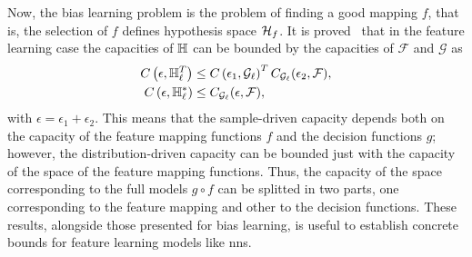 Now, the bias learning problem is the problem of finding a good mapping $f$, that is, the selection of $f$ defines hypothesis space $\mathcal{H}_f$.
It is proved~\cite[Theorem~6]{baxter2000model} that in the feature learning case the capacities of $\mathbb{H}$ can be bounded by the capacities of $\mathcal{F}$ and $\mathcal{G}$ as
\begin{align*}
    C\left(\epsilon, \mathbb{H}^{T}_\ell\right) &\leq C\left(\epsilon_1, \mathcal{G}_\ell\right)^T C_{\mathcal{G}_\ell}(\epsilon_2, \mathcal{F}) , \\
    C\left(\epsilon, \mathbb{H}^{*}_\ell\right) &\leq C_{\mathcal{G}_\ell}(\epsilon, \mathcal{F}) ,
\end{align*}
with $\epsilon = \epsilon_1 + \epsilon_2 $. 
This means that the sample-driven capacity depends both on the capacity of the feature mapping functions $f$ and the decision functions $g$; however, the distribution-driven capacity can be bounded just with the capacity of the space of the feature mapping functions. Thus, the capacity of the space corresponding to the full models $g \circ f$ can be splitted in two parts, one corresponding to the feature mapping and other to the decision functions.
These results, alongside those presented for bias learning, is useful to establish concrete bounds for feature learning models like \acrshort{nns}.

